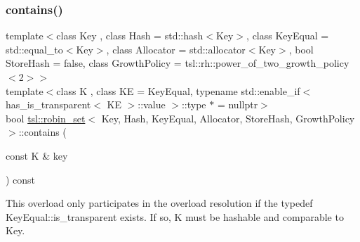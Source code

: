 \subsubsection{\texorpdfstring{contains()}{contains()}\hspace{0.1cm}{\footnotesize\ttfamily [2/3]}}
{\footnotesize\ttfamily template$<$class Key , class Hash  = std\+::hash$<$\+Key$>$, class Key\+Equal  = std\+::equal\+\_\+to$<$\+Key$>$, class Allocator  = std\+::allocator$<$\+Key$>$, bool Store\+Hash = false, class Growth\+Policy  = tsl\+::rh\+::power\+\_\+of\+\_\+two\+\_\+growth\+\_\+policy$<$2$>$$>$ \\
template$<$class K , class KE  = Key\+Equal, typename std\+::enable\+\_\+if$<$ has\+\_\+is\+\_\+transparent$<$ K\+E $>$\+::value $>$\+::type $\ast$  = nullptr$>$ \\
bool \mbox{\hyperlink{classtsl_1_1robin__set}{tsl\+::robin\+\_\+set}}$<$ Key, Hash, Key\+Equal, Allocator, Store\+Hash, Growth\+Policy $>$\+::contains (\begin{DoxyParamCaption}\item[{const K \&}]{key }\end{DoxyParamCaption}) const\hspace{0.3cm}{\ttfamily [inline]}}

This overload only participates in the overload resolution if the typedef Key\+Equal\+::is\+\_\+transparent exists. If so, K must be hashable and comparable to Key. \mbox{\label{classtsl_1_1robin__set_aef184b7334d440fb7ff915205bfbfb34}} 
